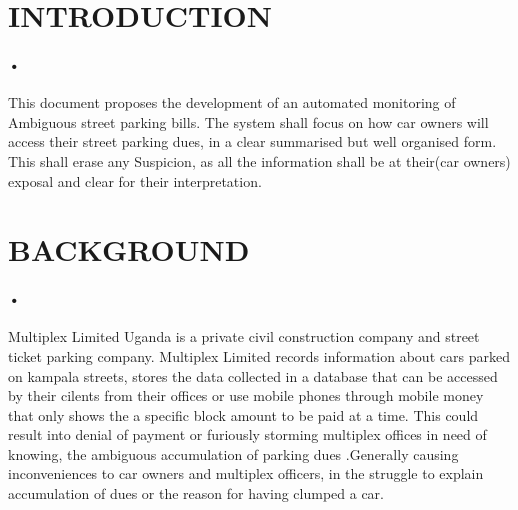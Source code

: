 \documentclass[12pt]{article}
\begin{document}
\section{INTRODUCTION}
\paragraph{•}
This document proposes the development of an automated monitoring of Ambiguous street parking bills. The system shall focus on how car owners will access their street parking dues, in a clear summarised but well organised form. This shall erase any Suspicion, as all the information shall be at their(car owners) exposal and clear for their interpretation.
  
\section{BACKGROUND}
\paragraph{•}
Multiplex Limited Uganda is a private civil construction company and street ticket parking company. Multiplex Limited records information about cars parked on kampala streets, stores the data collected in a database that can be accessed by their cilents from their offices or use mobile phones through mobile money that only shows the a specific block amount to be paid at a time. This could result into denial of payment or furiously storming multiplex offices in need of knowing, the ambiguous accumulation of parking dues .Generally causing inconveniences to car owners and multiplex officers, in the struggle to explain accumulation of dues or the reason for having clumped a car.
\end{document}
